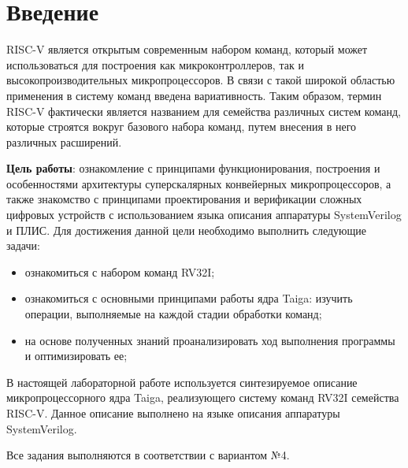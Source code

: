 \chapter*{Введение}
RISC-V является открытым современным набором команд, который может использоваться для построения как микроконтроллеров, так и высокопроизводительных микропроцессоров. В связи с такой широкой областью применения в систему команд введена вариативность. Таким образом, термин RISC-V фактически является названием для семейства различных систем команд, которые строятся вокруг базового набора команд, путем внесения в него различных расширений.

\textbf{Цель работы}: ознакомление с принципами функционирования, построения и особенностями архитектуры суперскалярных конвейерных микропроцессоров, а также знакомство с принципами проектирования и верификации сложных цифровых устройств с использованием языка описания аппаратуры SystemVerilog и ПЛИС.
Для достижения данной цели необходимо выполнить следующие задачи:
\begin{itemize}
	\item ознакомиться с набором команд RV32I;
	\item ознакомиться с основными принципами работы ядра Taiga: изучить операции, выполняемые на каждой стадии обработки команд;
	\item на основе полученных знаний проанализировать ход выполнения программы и оптимизировать ее; 
\end{itemize}

В настоящей лабораторной работе используется синтезируемое описание микропроцессорного ядра Taiga, реализующего систему команд RV32I семейства RISC-V. Данное описание выполнено на языке описания аппаратуры SystemVerilog.

Все задания выполняются в соответствии с вариантом №4.
